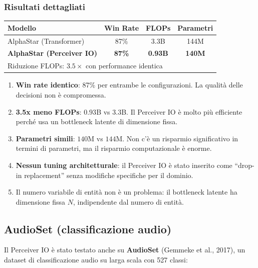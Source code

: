 \documentclass[12pt,a4paper]{article}
\begin{document}
\subsubsection{Risultati dettagliati}

\begin{center}
\begin{tabular}{lccc}
\toprule
\textbf{Modello} & \textbf{Win Rate} & \textbf{FLOPs} & \textbf{Parametri} \\
\midrule
AlphaStar (Transformer) & 87\% & 3.3B & 144M \\
\textbf{AlphaStar (Perceiver IO)} & \textbf{87\%} & \textbf{0.93B} & \textbf{140M} \\
\midrule
\multicolumn{4}{l}{\scriptsize Riduzione FLOPs: $3.5\times$ con performance identica} \\
\bottomrule
\end{tabular}
\end{center}

\begin{notabox}
\begin{enumerate}
    \item \textbf{Win rate identico}: 87\% per entrambe le configurazioni. La qualit\`a delle decisioni non \`e compromessa.
    \item \textbf{3.5x meno FLOPs}: $0.93$B vs $3.3$B. Il Perceiver IO \`e molto pi\`u efficiente perch\'e usa un bottleneck latente di dimensione fissa.
    \item \textbf{Parametri simili}: $140$M vs $144$M. Non c'\`e un risparmio significativo in termini di parametri, ma il risparmio computazionale \`e enorme.
    \item \textbf{Nessun tuning architetturale}: il Perceiver IO \`e stato inserito come ``drop-in replacement'' senza modifiche specifiche per il dominio.
    \item Il numero variabile di entit\`a non \`e un problema: il bottleneck latente ha dimensione fissa $N$, indipendente dal numero di entit\`a.
\end{enumerate}
\end{notabox}


\subsection{AudioSet (classificazione audio)}

Il Perceiver IO \`e stato testato anche su \textbf{AudioSet} (Gemmeke et al., 2017), un dataset di classificazione audio su larga scala con 527 classi:
\end{document}
